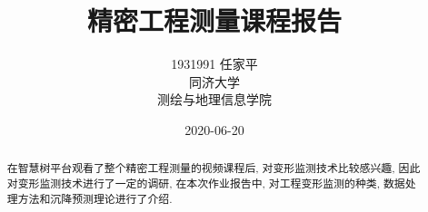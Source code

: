 \documentclass[a4paper, UTF8, 12pt]{article}
\begin{document}
\title{\Huge 精密工程测量课程报告}
\author{\Large 
        1931991 任家平 \\[12pt]
        同济大学 \\[12pt]
        测绘与地理信息学院}
\date{2020-06-20}
\maketitle
\thispagestyle{empty}

\renewcommand\abstractname{\Large\textbf{摘要}}
\newpage
\begin{abstract}

    在智慧树平台观看了整个精密工程测量的视频课程后, 对变形监测技术比较感兴趣, 因此对变形监测技术进行了一定的调研, 在本次作业报告中, 对工程变形监测的种类, 数据处理方法和沉降预测理论进行了介绍.

\end{abstract}
\thispagestyle{empty}

\newpage
{}
\tableofcontents

\newpage
{}





\newpage
\nocite{*}

\end{document}
